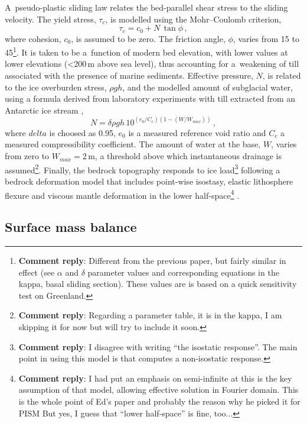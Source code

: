 \documentclass[tc, manuscript]{copernicus}
\newcommand{\renote}[1]{\footnote{\textbf{Comment reply}: #1}}
\begin{document}
A~pseudo-plastic sliding law \citep{Bueler.Pelt.2014} relates the
bed-parallel shear stress to the sliding velocity. The yield stress, $\tau_c$,
is modelled using the Mohr--Coulomb criterion,
\begin{equation}
   \tau_c = c_0 + N\,\tan{\phi} \,,
\end{equation}
where cohesion, $c_0$, is assumed to be zero. The friction angle, $\phi$,
varies from 15 to 45{\degree}\renote{
    Different from the previous paper, but fairly similar in effect (see
    $\alpha$ and $\delta$ parameter values and corresponding equations in the
    kappa, basal sliding section). These values are is based on a quick
    sensitivity test on Greenland.}.
It is taken to be a~function of modern bed elevation, with lower values at
lower elevations (<200\,m above sea level), thus accounting for a~weakening of
till associated with the presence of marine sediments. Effective pressure, $N$,
is related to the ice overburden stress, $\rho gh$, and the modelled amount of
subglacial water, using a formula derived from laboratory experiments with till
extracted from an Antarctic ice stream \citep{Tulaczyk.etal.2000,
Bueler.Pelt.2014},
\begin{equation}
    N = \delta \rho gh \, 10^{(e_0/C_c) (1 - (W/W_{max}))} \,,
\end{equation}
where $delta$ is choosed as 0.95, $e_0$ is a measured reference void ratio and
$C_c$ a measured compressibility coefficient. The amount of water at the base,
$W$, varies from zero to $W_{max}=2$\,m, a threshold above which instantaneous
drainage is assumed\renote{
    Regarding a parameter table, it is in the kappa, I am skipping it for now
    but will try to include it soon.}.
Finally, the bedrock topography responds to ice load\renote{
    I disagree with writing ``the isostatic response''. The main point in
    using this model is that computes a non-isostatic response.}
following a bedrock deformation model that includes point-wise isostasy,
elastic lithosphere flexure and viscous mantle deformation in the lower
half-space\renote{
    I had put an emphasis on semi-infinite at this is the key assumption of
    that model, allowing effective solution in Fourier domain. This is the
    whole point of Ed's paper and probably the reason why he picked it for PISM
    But yes, I guess that ``lower half-space'' is fine, too...}
\citep{Lingle.Clark.1985,Bueler.etal.2007}.

\subsection{Surface mass balance}
\end{document}
